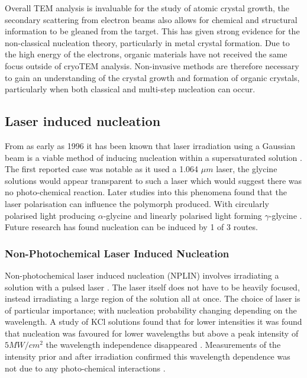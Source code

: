 Overall TEM analysis is invaluable for the study of atomic 
crystal growth, the secondary scattering from electron 
beams also allows for chemical and structural information 
to be gleaned from the target. This has given strong evidence
for the non-classical nucleation theory, particularly in 
metal crystal formation. Due to the high energy of the 
electrons, organic materials have not received the same
focus outside of cryoTEM analysis. Non-invasive methods
are therefore necessary to gain an understanding of the
crystal growth and formation of organic crystals, 
particularly when both classical and multi-step nucleation 
can occur.

\subsection{Laser induced nucleation}
From as early as 1996 it has been known that laser irradiation 
using a Gaussian beam is a viable method of inducing nucleation 
within a supersaturated solution \cite{Garetz1996}. The first 
reported case was notable as it used a 1.064 $\mu m$ laser, the 
glycine solutions would appear transparent to such a laser which 
would suggest there was no photo-chemical reaction. Later studies 
into this phenomena found that the laser polarisation can influence 
the polymorph produced. With circularly polarised light producing 
$\alpha$-glycine and linearly polarised light forming $\gamma$-glycine 
\cite{Garetz2002}. Future research has found nucleation can be 
induced by 1 of 3 routes.

\subsubsection{Non-Photochemical Laser Induced Nucleation}
Non-photochemical laser induced nucleation (NPLIN) involves 
irradiating a solution with a pulsed laser \cite{Garetz1996,
Garetz2002,Sun2006}. The laser itself does not have to be 
heavily focused, instead irradiating a large region of the 
solution all at once. The choice of laser is of particular 
importance; with nucleation probability changing depending 
on the wavelength. A study of KCl solutions found that for 
lower intensities it was found that nucleation was favoured 
for lower wavelengths but above a peak intensity of $5 MW/
cm^2$ the wavelength independence disappeared \cite{Kacker2017}. 
Measurements of the intensity prior and after irradiation 
confirmed this wavelength dependence was not due to any 
photo-chemical interactions \cite{Kacker2017}.

